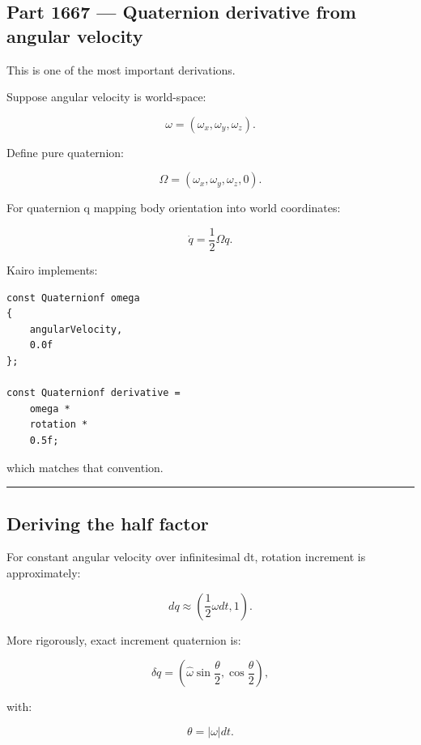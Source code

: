 \subsection{Part 1667 --- Quaternion derivative from angular velocity}\label{06-engine-ii-ch037-part-1667-quaternion-derivative-from-angular-velocity}

\hypertarget{06-engine-ii-ch037-part-1667-quaternion-derivative-from-angular-velocity}{}

This is one of the most important derivations.

Suppose angular velocity is world-space:

\[
\omega=
(\omega_x,\omega_y,\omega_z).
\]

Define pure quaternion:

\[
\Omega
=
(\omega_x,\omega_y,\omega_z,0).
\]

For quaternion q mapping body orientation into world coordinates:

\[
\boxed{
\dot q
=
\frac12
\Omega q.
}
\]

Kairo implements:

\begin{verbatim}
const Quaternionf omega
{
    angularVelocity,
    0.0f
};

const Quaternionf derivative =
    omega *
    rotation *
    0.5f;
\end{verbatim}

which matches that convention.

\begin{center}\rule{0.5\linewidth}{0.5pt}\end{center}

\subsection{Deriving the half factor}\label{06-engine-ii-ch037-deriving-the-half-factor}

\hypertarget{06-engine-ii-ch037-deriving-the-half-factor}{}

For constant angular velocity over infinitesimal dt, rotation increment is approximately:

\[
dq
\approx
\left(
\frac12\omega dt,
1
\right).
\]

More rigorously, exact increment quaternion is:

\[
\delta q
=
\left(
\hat\omega
\sin\frac{\theta}{2},
\cos\frac{\theta}{2}
\right),
\]

with:

\[
\theta
=
|\omega|dt.
\]

